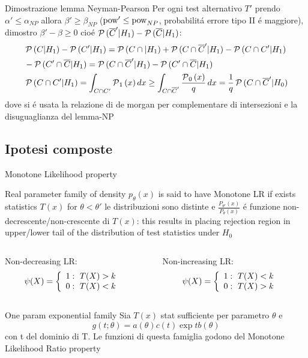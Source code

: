 \documentclass[asd-beamer.tex]{subfiles}%
\begin{document}
\begin{wordonframe}{Dimostrazione lemma Neyman-Pearson}
Per ogni test alternativo $T'$ prendo $\alpha'\leq\alpha_{NP}$ allora $\beta'\geq\beta_{NP}$ ($\operatorname{pow}'\leq\operatorname{pow}_{NP}$, probabilit\'a errore tipo II \'e maggiore), dimostro $\beta'-\beta\geq0$ cio\'e $\operatorname{\mathcal{P}}{(\overline{C}'|H_1)}-\operatorname{\mathcal{P}}{(\overline{C}|H_1)}$:
\begin{align*}
&\operatorname{\mathcal{P}}{(C|H_1)}-\operatorname{\mathcal{P}}{(C'|H_1)}=\operatorname{\mathcal{P}}{(C\cap|H_1)}+\operatorname{\mathcal{P}}{(C\cap\overline{C}'|H_1)}-\operatorname{\mathcal{P}}{(C\cap C'|H_1)}\\
&-\operatorname{\mathcal{P}}{(C'\cap\overline{C}|H_1)}=\operatorname{\mathcal{P}}{(C\cap\overline{C}'|H_1)}-\operatorname{\mathcal{P}}{(C'\cap\overline{C}|H_1)}\\
&\operatorname{\mathcal{P}}{(C\cap C'|H_1)}=\int_{C\cap C'}\operatorname{\mathcal{P}}_1{(x)}\,dx\geq\int_{C\cap \overline{C}'}\frac{\operatorname{\mathcal{P}}_0{(x)}}{q}\,dx=\frac{1}{q}\operatorname{\mathcal{P}}{(C\cap\overline{C}'|H_0)}
\end{align*}
dove si \'e usata la relazione di de morgan per complementare di intersezioni e la disuguaglianza del lemma-NP
\end{wordonframe}

\subsection{Ipotesi composte}

\begin{frame}{Monotone Likelihood property}\frameintoc
\begin{block}{}
Real parameter family of density $p_{\theta}(x)$ is said to have Monotone LR if exists statistics $T(x)$ for $\theta<\theta'$ le distribuzioni sono distinte e $\frac{P_{\theta'}(x)}{P_{\theta}(x)}$ \'e funzione non-decrescente/non-crescente di $T(x)$: this results in placing rejection region in upper/lower tail of the distribution of test statistics under $H_0$
\begin{columns}[T]
	\begin{column}{0.5\textwidth}
		Non-decreasing LR:
		\begin{align*}
		&\psi(X)=\left\{\begin{array}{l}1:\ T(X)>k\\0:\ T(X)<k\\ \end{array}\right.
		\end{align*}
	\end{column}
	\begin{column}{0.5\textwidth}
		Non-increasing LR:
		\begin{align*}
		&\psi(X)=\left\{\begin{array}{l}1:\ T(X)<k\\0:\ T(X)>k\\ \end{array}\right.
		\end{align*}
	\end{column}
\end{columns}
\end{block}
\begin{block}{One param exponential family}
Sia $T(x)$ stat sufficiente per parametro $\theta$ e 
\begin{equation*}
g(t;\theta)=a(\theta)c(t)\exp{tb(\theta)}
\end{equation*}
con t del dominio di T. Le funzioni di questa famiglia godono del Monotone Likelihood Ratio property
\end{block}
\end{frame}
\end{document}
